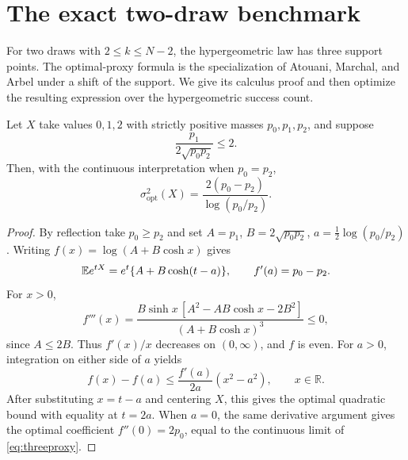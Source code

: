 \section{The exact two-draw benchmark}\label{sec:twodraw}
For two draws with $2\le k\le N-2$, the hypergeometric law has three support points. The optimal-proxy formula is the specialization of Atouani, Marchal, and Arbel \cite[Theorem 3.2 and Corollary 3.3]{AtouaniMarchalArbel} under a shift of the support. We give its calculus proof and then optimize the resulting expression over the hypergeometric success count.

\begin{lemma}\label{lem:threemass}
Let $X$ take values $0,1,2$ with strictly positive masses $p_0,p_1,p_2$, and suppose
\[
 \frac{p_1}{2\sqrt{p_0p_2}}\le2.
\]
Then, with the continuous interpretation when $p_0=p_2$,
\begin{equation}\label{eq:threeproxy}
 \sigma^2_{\mathrm{opt}}(X)=\frac{2(p_0-p_2)}{\log(p_0/p_2)}.
\end{equation}
\end{lemma}
\begin{proof}
By reflection take $p_0\ge p_2$ and set $A=p_1$, $B=2\sqrt{p_0p_2}$, $a=\frac12\log(p_0/p_2)$. Writing $f(x)=\log(A+B\cosh x)$ gives
\[
 \mathbb E e^{tX}=e^t\{A+B\cosh(t-a)\},\qquad
 f'(a)=p_0-p_2.
\]
For $x>0$,
\[
 f'''(x)=\frac{B\sinh x\,[A^2-AB\cosh x-2B^2]}{(A+B\cosh x)^3}\le0,
\]
since $A\le2B$. Thus $f'(x)/x$ decreases on $(0,\infty)$, and $f$ is even. For $a>0$, integration on either side of $a$ yields
\[
 f(x)-f(a)\le\frac{f'(a)}{2a}(x^2-a^2),\qquad x\in\mathbb R.
\]
After substituting $x=t-a$ and centering $X$, this gives the optimal quadratic bound with equality at $t=2a$. When $a=0$, the same derivative argument gives the optimal coefficient $f''(0)=2p_0$, equal to the continuous limit of \eqref{eq:threeproxy}.
\end{proof}

